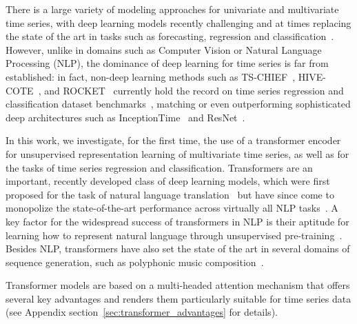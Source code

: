 \documentclass{article} \usepackage{iclr2021_conference,times}
\begin{document}
There is a large variety of modeling approaches for univariate and multivariate time series, with deep learning models recently challenging and at times replacing the state of the art in tasks such as forecasting, regression and classification~\citep{de_brouwer_gru-ode-bayes_2019, regression_monash_2020, ismail_fawaz_deep_review2019}. However, unlike in domains such as Computer Vision or Natural Language Processing (NLP), the dominance of deep learning for time series is far from established: in fact, non-deep learning methods such as TS-CHIEF~\citep{ts-chief_2020}, HIVE-COTE~\citep{hive_cote_2018}, and ROCKET~\citep{rocket_2020} currently hold the record on time series regression and classification dataset benchmarks~\citep{regression_monash_2020, classification_archive}, matching or even outperforming sophisticated deep architectures such as InceptionTime~\citep{inceptiontime_2019} and ResNet~\citep{ismail_fawaz_deep_review2019}. 

In this work, we investigate, for the first time, the use of a transformer encoder for unsupervised representation learning of multivariate time series, as well as for the tasks of time series regression and classification. Transformers are an important, recently developed class of deep learning models, which were first proposed for the task of natural language translation~\citep{vaswani_attention_2017} but have since come to monopolize the state-of-the-art performance across virtually all NLP tasks~\citep{t5}. A key factor for the widespread success of transformers in NLP is their aptitude for learning how to represent natural language through unsupervised pre-training~\citep{gpt3, t5, devlin_bert_2018}.  Besides NLP, transformers have also set the state of the art in several domains of sequence generation, such as polyphonic music composition~\citep{music2018}.

Transformer models are based on a multi-headed attention mechanism that offers several key advantages and renders them particularly suitable for time series data (see Appendix section~\ref{sec:transformer_advantages} for details).
\end{document}
